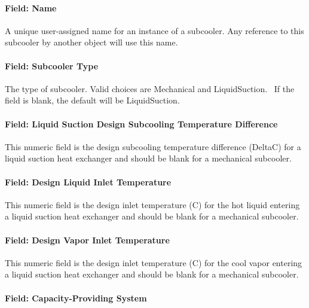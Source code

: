 \paragraph{Field: Name}\label{field-name-8-016}

A unique user-assigned name for an instance of a subcooler. Any reference to this subcooler by another object will use this name.

\paragraph{Field: Subcooler Type}\label{field-subcooler-type}

The type of subcooler. Valid choices are Mechanical and LiquidSuction.~ If the field is blank, the default will be LiquidSuction.

\paragraph{Field: Liquid Suction Design Subcooling Temperature Difference}\label{field-liquid-suction-design-subcooling-temperature-difference}

This numeric field is the design subcooling temperature difference (DeltaC) for a liquid suction heat exchanger and should be blank for a mechanical subcooler.

\paragraph{Field: Design Liquid Inlet Temperature}\label{field-design-liquid-inlet-temperature}

This numeric field is the design inlet temperature (C) for the hot liquid entering a liquid suction heat exchanger and should be blank for a mechanical subcooler.

\paragraph{Field: Design Vapor Inlet Temperature}\label{field-design-vapor-inlet-temperature}

This numeric field is the design inlet temperature (C) for the cool vapor entering a liquid suction heat exchanger and should be blank for a mechanical subcooler.

\paragraph{Field: Capacity-Providing System}\label{field-capacity-providing-system}


